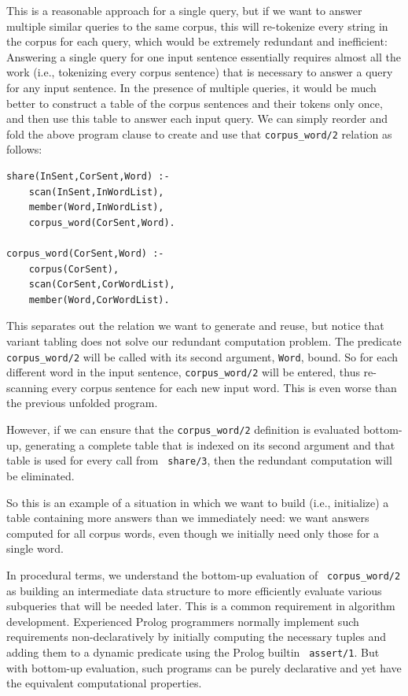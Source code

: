 This is a reasonable approach for a single query, but if we want to
answer multiple similar queries to the same corpus, this will
re-tokenize every string in the corpus for each query, which would be
extremely redundant and inefficient: Answering a
single query for one input sentence essentially requires almost all
the work (i.e., tokenizing every corpus sentence) that is necessary to
answer a query for any input sentence.  In the presence of multiple
queries, it would be much better to construct a table of
the corpus sentences and their tokens only once, and then use this
table to answer each input query.  We can simply reorder and fold the
above program clause to create and use that {\tt corpus\_word/2}
relation as follows:

\begin{example}
\footnotesize
\begin{verbatim}
share(InSent,CorSent,Word) :-
    scan(InSent,InWordList),
    member(Word,InWordList),
    corpus_word(CorSent,Word).
    
corpus_word(CorSent,Word) :-
    corpus(CorSent),
    scan(CorSent,CorWordList),
    member(Word,CorWordList).
\end{verbatim}
\normalsize
\end{example}

\noindent This separates out the relation we want to generate and reuse, but
notice that variant tabling does not solve our redundant computation
problem.  The predicate {\tt corpus\_word/2} will be called with its
second argument, {\tt Word}, bound.  So for each different word in the
input sentence, {\tt corpus\_word/2} will be entered, thus re-scanning
every corpus sentence for each new input word.  This is even worse than
the previous unfolded program.  

However, if we can ensure that the {\tt corpus\_word/2} definition is
evaluated bottom-up, generating a complete table that is indexed on
its second argument and that table is used for every call from {\tt
  share/3}, then the redundant computation will be eliminated.

So this is an example of a situation in which we want to build (i.e.,
initialize) a table containing more answers than we immediately need:
we want answers computed for all corpus words, even though we
initially need only those for a single word.

In procedural terms, we understand the bottom-up evaluation of {\tt
  corpus\_word/2} as building an intermediate data structure to more
efficiently evaluate various subqueries that will be needed later.
This is a common requirement in algorithm development.  Experienced
Prolog programmers normally implement such requirements
non-declaratively by initially computing the necessary tuples and
adding them to a dynamic predicate using the Prolog builtin {\tt
  assert/1}.  But with bottom-up evaluation, such programs can be
purely declarative and yet have the equivalent computational
properties.

